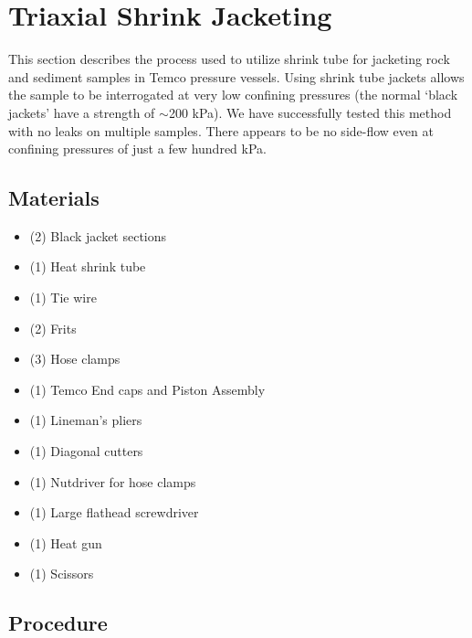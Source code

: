 \section{Triaxial Shrink Jacketing}
This section describes the process used to utilize shrink tube for jacketing rock and sediment samples in Temco pressure vessels.  Using shrink tube jackets allows the sample to be interrogated at very low confining pressures (the normal `black jackets' have a strength of $\sim$200 kPa).  We have successfully tested this method with no leaks on multiple samples.  There appears to be no side-flow even at confining pressures of just a few hundred kPa.  

\subsection{Materials}

\begin{itemize}

\item{(2) Black jacket sections}
\item{(1) Heat shrink tube}
\item{(1) Tie wire}
\item{(2) Frits}
\item{(3) Hose clamps}
\item{(1) Temco End caps and Piston Assembly}
\item{(1) Lineman's pliers}
\item{(1) Diagonal cutters}
\item{(1) Nutdriver for hose clamps}
\item{(1) Large flathead screwdriver}
\item{(1) Heat gun}
\item{(1) Scissors }


\end{itemize}

\subsection{Procedure}


